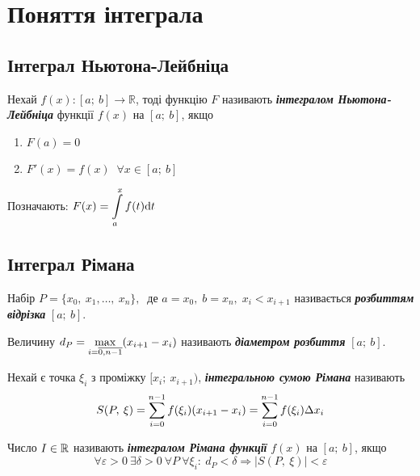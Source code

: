 \section{\Large{Поняття інтеграла}}
\subsection{\large{Інтеграл Ньютона-Лейбніца}}


\begin{definition}
    Нехай $f(x):[a;\:b]\to\mathbb{R}$, тоді функцію $F$ називають                     \textcolor{NavyBlue}{\textbf{\textit{інтегралом Ньютона-Лейбніца}}} функції $f(x)$ на $[a;\:b]$, якщо 
    \begin{enumerate}
        \item $F(a) = 0$
        \item $F'(x) = f(x) \;\; \forall x \in [a; \: b]$
    \end{enumerate}
    Позначають: $F(x) = \displaystyle\int\limits_a^x f(t) \mathrm{d}t$ \\
\end{definition}


\subsection{\large{Інтеграл Рімана}}
\begin{definition}
    Набір $P = \{ x_0,\: x_1, \ldots, \: x_n \},\:$ де $a = x_0, \; b = x_n, \; x_i < x_{i + 1}$ називається \textcolor{NavyBlue}{\textbf{\textit{розбиттям відрізка}}} $[a;\:b]$.\\
\end{definition}


\begin{definition}
    Величину $d_P = \displaystyle\max\limits_{i = \overline{0, n - 1}} (x_{i + 1} - x_i)$ називають \textcolor{NavyBlue}{\textbf{\textit{діаметром розбиття}}} $[a;\:b]$. \\
\end{definition}


\begin{definition}
    Нехай є точка $\xi_i $ з проміжку $ [x_i;\:x_{i + 1})$, \textcolor{NavyBlue}{\textbf{\textit{інтегральною сумою Рімана}}} називають \\
    \[ S(P,\: \xi) = \displaystyle\sum\limits_{i=0}^{n-1} f(\xi_i) (x_{i+1} - x_i) = \displaystyle\sum\limits_{i=0}^{n-1} f(\xi_i) \Delta x_i \]
\end{definition}


\begin{definition}
    Число $I \in \mathbb{R}$ називають \textcolor{NavyBlue}{\textbf{\textit{інтегралом Рімана функції}}} $f(x)$ на $[a;\:b]$, якщо
    \[ \forall \varepsilon>0\ \exists\delta>0 \ \forall P \ \forall\xi_i: \ d_P<\delta \Rightarrow \left| S(P,\:\xi) \right| <\varepsilon \]
\end{definition}



